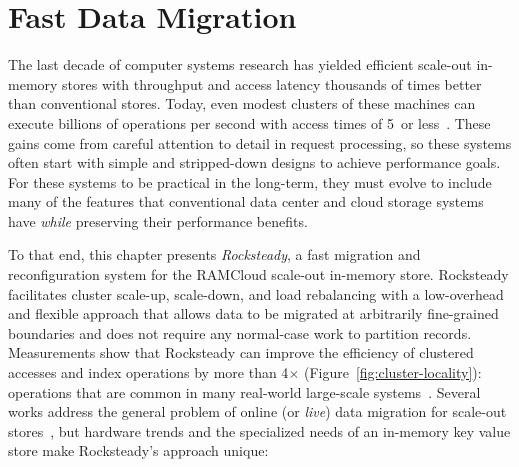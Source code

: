 \chapter{Fast Data Migration}

The last decade of computer systems research has yielded efficient scale-out
in-memory stores with throughput and access latency thousands of times better
than conventional stores. Today, even modest clusters of these machines can
execute billions of operations per second with access times of 5~\us or
less~\cite{ramcloud,farm-2014}.  These gains come from careful attention to detail
in request processing, so these systems often start with simple
and stripped-down designs to achieve performance goals. For these
systems to be practical in the long-term, they must evolve to include many of the
features that conventional data center and cloud storage systems have
{\em while} preserving their performance benefits.

To that end, this chapter presents {\em Rocksteady}, a fast migration
and reconfiguration
system for the RAMCloud scale-out in-memory store.  Rocksteady
facilitates cluster
scale-up, scale-down, and load rebalancing with a low-overhead and flexible
approach that allows data to be migrated at arbitrarily fine-grained boundaries and does not
require any normal-case work to partition records.  Measurements show that
Rocksteady can improve the efficiency of clustered accesses and index
operations by more than 4$\times$ (Figure~\ref{fig:cluster-locality}): operations that are common in many
real-world large-scale systems~\cite{fb-memcache,spanner}.  Several works
address the general problem of online (or {\em live}) data migration for
scale-out stores~\cite{slacker,estore,squall,albatross,zephyr,dynamo,spanner},
but hardware trends and the specialized needs of an in-memory key value store
make Rocksteady's approach unique:



